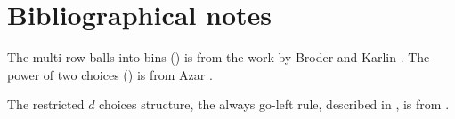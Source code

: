 

\section{Bibliographical notes}

The multi-row balls into bins () is from the
work by Broder and Karlin \cite{bk-mah-90}. The power of two choices
() is from Azar \etal \cite{abku-ba-90}.


The restricted $d$ choices structure, the always go-left rule,
described in , is from \cite{v-hshlb-03}.



%

\ChapterEnd{}

